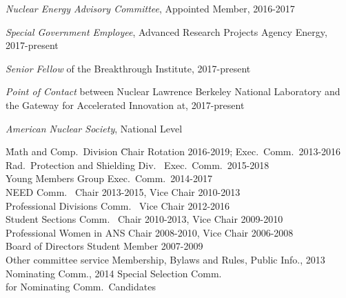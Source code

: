 \textit{Nuclear Energy Advisory Committee}, Appointed Member, 2016-2017


\textit{Special Government Employee}, Advanced Research Projects Agency Energy, 2017-present

\textit{Senior Fellow} of the Breakthrough Institute, 2017-present

\textit{Point of Contact} between Nuclear Lawrence Berkeley National Laboratory and the Gateway for Accelerated Innovation at, 2017-present

\textit{American Nuclear Society}, National Level
\begin{tabbing}
\hspace*{2 em}\= Math and Comp.\ Division \hspace*{6em} \= Chair Rotation 2016-2019; Exec.\ Comm.\ 2013-2016 \\
%
\> Rad.\ Protection and Shielding Div.\ \> Exec.\ Comm.\ 2015-2018\\
%
\> Young Members Group \> Exec.\ Comm.\ 2014-2017\\
%
\> NEED Comm.\ \> Chair 2013-2015, Vice Chair 2010-2013\\
%
\> Professional Divisions Comm.\ \> Vice Chair 2012-2016 \\
%
\> Student Sections Comm.\ \> Chair 2010-2013, Vice Chair 2009-2010\\
%
\> Professional Women in ANS \> Chair 2008-2010, Vice Chair 2006-2008\\	
%
\> Board of Directors \> Student Member 2007-2009\\
%
\> Other committee service \>	Membership, Bylaws and Rules, Public Info., 2013 \\ \> \> Nominating Comm., 2014 Special Selection Comm.\ \\ \> \> for Nominating Comm.\ Candidates
\end{tabbing}


